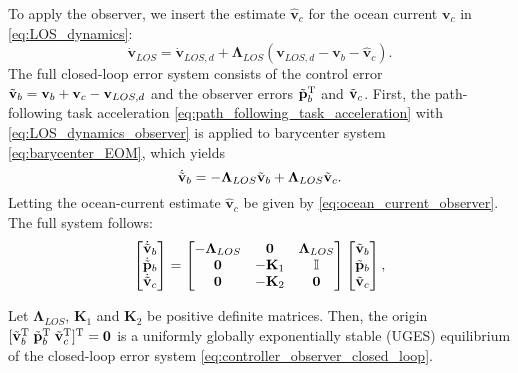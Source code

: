To apply the observer, we insert the estimate $\hat{\mathbf{v}}_c$ for the ocean current $\mathbf{v}_c$ in \eqref{eq:LOS_dynamics}:
\begin{equation} \label{eq:LOS_dynamics_observer}
    \dot{\mathbf{v}}_{LOS} = \dot{\mathbf{v}}_{LOS,d} + \mathbf{\Lambda}_{LOS} (\mathbf{v}_{LOS,d} - \mathbf{v}_b-\hat{\mathbf{v}}_c).
\end{equation}
The full closed-loop error system consists of the control error $\Tilde{\mathbf{v}}_b = \mathbf{v}_b + \mathbf{v}_c - \mathbf{v}_{LOS,d}$ and the observer errors $\Tilde{\mathbf{p}}_b^{\rm T}$ and $\Tilde{\mathbf{v}}_c$. First, the path-following task acceleration \eqref{eq:path_following_task_acceleration} with \eqref{eq:LOS_dynamics_observer} is applied to barycenter system \eqref{eq:barycenter_EOM},  which yields
\begin{equation}
        \dot{\Tilde{\mathbf{v}}}_b = -\mathbf{\Lambda}_{LOS}\Tilde{\mathbf{v}}_b + \mathbf{\Lambda}_{LOS} \Tilde{\mathbf{v}}_c.
\end{equation}
Letting the ocean-current estimate $\hat{\mathbf{v}}_c$ be given by \eqref{eq:ocean_current_observer}. The full system follows:
\begin{equation}\label{eq:controller_observer_closed_loop}
    \begin{bmatrix}
         \dot{\Tilde{\mathbf{v}}}_b\\
        \dot{\Tilde{\mathbf{p}}}_b\\
        \dot{\Tilde{\mathbf{v}}}_c
    \end{bmatrix} = \begin{bmatrix}
        -\mathbf{\Lambda}_{LOS} & \mathbf{0} & \mathbf{\Lambda}_{LOS}\\
        \mathbf{0} & -\mathbf{K}_1 & \mathbb{I}\\
        \mathbf{0} & -\mathbf{K}_2 & \mathbf{0}
    \end{bmatrix}\begin{bmatrix}
        \Tilde{\mathbf{v}}_b\\
        \Tilde{\mathbf{p}}_b\\
        \Tilde{\mathbf{v}}_c
    \end{bmatrix},
\end{equation}

\begin{lemma}\label{lemma:controller_observer_closed_loop}
    Let $\bm{\Lambda}_{LOS}$, $\mathbf{K}_1$ and $\mathbf{K}_2$ be positive definite matrices. Then, the origin $[\Tilde{\mathbf{v}}_b^{\rm T}\;  \Tilde{\mathbf{p}}_b^{\rm T}\;        \Tilde{\mathbf{v}}_c^{\rm T}]^{\rm T} = \mathbf{0}$ is a uniformly globally exponentially stable (UGES) equilibrium of the closed-loop error system \eqref{eq:controller_observer_closed_loop}.
\end{lemma}

